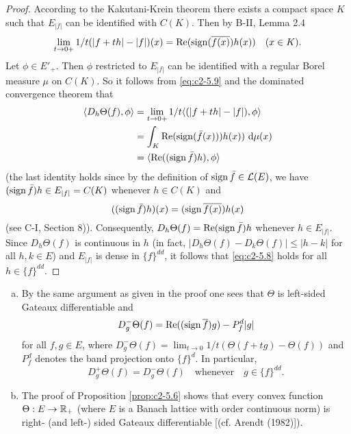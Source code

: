 \begin{proof}
According to the Kakutani-Krein theorem there exists a compact space
$K$ such that $E_{|f|}$ can be identified with $C(K)$. Then by B-II,
Lemma 2.4
\begin{equation}\label{eq:c2-5.9}
\lim_{t \to 0+} 1/t(|f+th| - |f|)(x) = \mathop{}\!\mathrm{Re}(\operatorname{sign} (\overline{f(x)})h(x)) \quad (x \in K).
\end{equation}
Let $\phi \in E'_{+}$. Then $\phi$ restricted to $E_{|f|}$ can be identified with a regular Borel measure $\mu$ on $C(K)$.
So it follows from \eqref{eq:c2-5.9} and the dominated convergence theorem that
\begin{align*}
\langle D_{h}\Theta(f),\phi \rangle &= \lim_{t \to 0+} 1/t \langle(|f + th| - |f|),\phi \rangle\\
&= \int_{K} \mathop{}\!\mathrm{Re}(\operatorname{sign} (\bar{f}(x)))h(x)) \, \mathop{}\!\mathrm{d}{\mu(x)} \\
&= \langle\mathop{}\!\mathrm{Re}((\operatorname{sign}  \bar{f})h),\phi\rangle
\end{align*}
(the last identity holds since by the definition of $\operatorname{sign}  \bar{f} \in \mathcal{L}(E)$,
we have $(\operatorname{sign}  \bar{f})h \in E_{|f|} = C(K)$ whenever $h \in C(K)$ and
\[
((\operatorname{sign}  \bar{f})h)(x) = (\operatorname{sign}  \overline{f(x)})h(x)
\]
(see C-I, Section 8)).
Consequently, $D_{h}\Theta(f) = \mathop{}\!\mathrm{Re}(\operatorname{sign}  \bar{f})h$ whenever $h \in E_{|f|}$. 
Since $D_{h}\Theta(f)$ is continuous in $h$ (in fact, $|D_{h}\Theta(f) - D_{k}\Theta(f)| \leq |h - k|$ for all $h,k \in E$) and $E_{|f|}$ is dense in $\{f\}^{dd}$, it follows that \eqref{eq:c2-5.8} holds for all $h \in \{f\}^{dd}$.
\end{proof}

\begin{remark}\label{rem:c2-5.7}
\begin{enumerate}[a)]
\item \label{rem:c2-5.7-1}
By the same argument as given in the proof one sees
that $\Theta$ is left-sided Gateaux differentiable and
\begin{equation*}
D^{-}_{g}\Theta(f) = \mathop{}\!\mathrm{Re}((\operatorname{sign}  \overline{f})g) - P^{d}_{f}|g|
\end{equation*}
for all $f, g \in E$, where $D^{-}_{g}\Theta(f) = \lim_{t \to 0} 1/t(\Theta(f + tg) - \Theta(f))$ and
$P^{d}_{f}$ denotes the band projection onto $\{f\}^{d}$. 
In particular,
\begin{equation}\label{eq:c2-5.10}
D^{+}_{g}\Theta(f) = D^{-}_{g}\Theta(f) \quad \text{whenever} \quad g \in \{f\}^{dd}.
\end{equation}
\item \label{rem:c2-5.7-2}
The proof of  Proposition \ref{prop:c2-5.6}   shows that every convex function $\Theta : E \to \mathbb{R}_{+}$
(where $E$ is a Banach lattice with order continuous norm) is right- (and left-) sided Gateaux differentiable [(cf. Arendt (1982)]).
\end{enumerate}
\end{remark}

